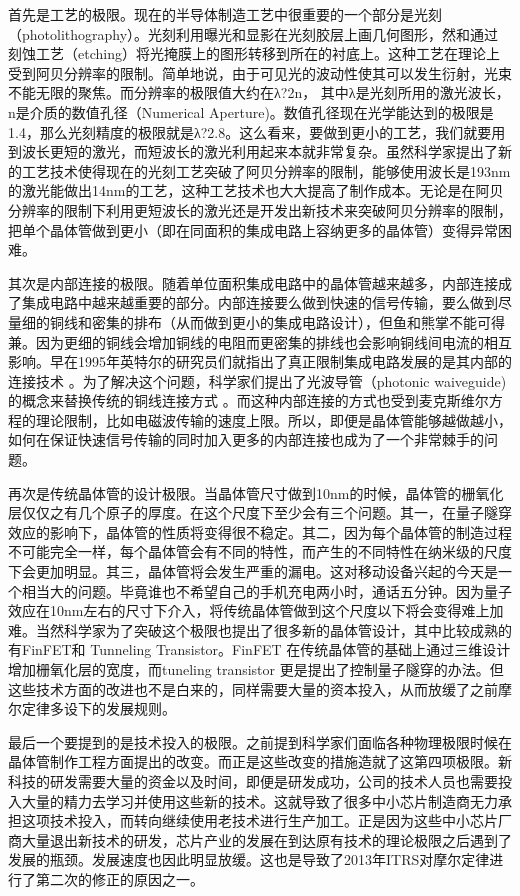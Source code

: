 \documentclass{ctexart}
\begin{document}
	首先是工艺的极限。现在的半导体制造工艺中很重要的一个部分是光刻（photolithography）。光刻利用曝光和显影在光刻胶层上画几何图形，然和通过刻蚀工艺（etching）将光掩膜上的图形转移到所在的衬底上。这种工艺在理论上受到阿贝分辨率的限制。简单地说，由于可见光的波动性使其可以发生衍射，光束不能无限的聚焦。而分辨率的极限值大约在λ?2n， 其中λ是光刻所用的激光波长，n是介质的数值孔径（Numerical Aperture)。数值孔径现在光学能达到的极限是1.4，那么光刻精度的极限就是λ?2.8。这么看来，要做到更小的工艺，我们就要用到波长更短的激光，而短波长的激光利用起来本就非常复杂。虽然科学家提出了新的工艺技术使得现在的光刻工艺突破了阿贝分辨率的限制，能够使用波长是193nm的激光能做出14nm的工艺，这种工艺技术也大大提高了制作成本。无论是在阿贝分辨率的限制下利用更短波长的激光还是开发出新技术来突破阿贝分辨率的限制，把单个晶体管做到更小（即在同面积的集成电路上容纳更多的晶体管）变得异常困难。
	
	其次是内部连接的极限。随着单位面积集成电路中的晶体管越来越多，内部连接成了集成电路中越来越重要的部分。内部连接要么做到快速的信号传输，要么做到尽量细的铜线和密集的排布（从而做到更小的集成电路设计），但鱼和熊掌不能可得兼。因为更细的铜线会增加铜线的电阻而更密集的排线也会影响铜线间电流的相互影响。早在1995年英特尔的研究员们就指出了真正限制集成电路发展的是其内部的连接技术 。为了解决这个问题，科学家们提出了光波导管（photonic waiveguide)的概念来替换传统的铜线连接方式 。而这种内部连接的方式也受到麦克斯维尔方程的理论限制，比如电磁波传输的速度上限。所以，即便是晶体管能够越做越小，如何在保证快速信号传输的同时加入更多的内部连接也成为了一个非常棘手的问题。
	
	再次是传统晶体管的设计极限。当晶体管尺寸做到10nm的时候，晶体管的栅氧化层仅仅之有几个原子的厚度。在这个尺度下至少会有三个问题。其一，在量子隧穿效应的影响下，晶体管的性质将变得很不稳定。其二，因为每个晶体管的制造过程不可能完全一样，每个晶体管会有不同的特性，而产生的不同特性在纳米级的尺度下会更加明显。其三，晶体管将会发生严重的漏电。这对移动设备兴起的今天是一个相当大的问题。毕竟谁也不希望自己的手机充电两小时，通话五分钟。因为量子效应在10nm左右的尺寸下介入，将传统晶体管做到这个尺度以下将会变得难上加难。当然科学家为了突破这个极限也提出了很多新的晶体管设计，其中比较成熟的有FinFET和 Tunneling Transistor。FinFET 在传统晶体管的基础上通过三维设计增加栅氧化层的宽度，而tuneling transistor 更是提出了控制量子隧穿的办法。但这些技术方面的改进也不是白来的，同样需要大量的资本投入，从而放缓了之前摩尔定律多设下的发展规则。
	
	最后一个要提到的是技术投入的极限。之前提到科学家们面临各种物理极限时候在晶体管制作工程方面提出的改变。而正是这些改变的措施造就了这第四项极限。新科技的研发需要大量的资金以及时间，即便是研发成功，公司的技术人员也需要投入大量的精力去学习并使用这些新的技术。这就导致了很多中小芯片制造商无力承担这项技术投入，而转向继续使用老技术进行生产加工。正是因为这些中小芯片厂商大量退出新技术的研发，芯片产业的发展在到达原有技术的理论极限之后遇到了发展的瓶颈。发展速度也因此明显放缓。这也是导致了2013年ITRS对摩尔定律进行了第二次的修正的原因之一。
	
\end{document}
